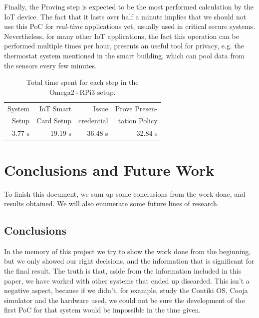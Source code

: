 \documentclass[journal]{IEEEtran}
\begin{document}
Finally, the Proving step is expected to be the most performed calculation by the IoT device. The fact that it lasts over half a minute implies that we should not use this PoC for \textit{real-time} applications yet, usually used in critical secure systems. Nevertheless, for many other IoT applications, the fact this operation can be performed multiple times per hour, presents an useful tool for privacy, e.g. the thermostat system mentioned in the smart building, which can pool data from the sensors every few minutes.


\begin{table}[!ht]
	\begin{center}
		\begin{tabular}{|r|r|r|r|}
			\hline
			System & IoT Smart  & Issue  & Prove Presen-\\
			Setup & Card Setup & credential & tation Policy\\ \hline
			3.77 s & 19.19 s & 36.48 s & 32.84 s \\ \hline
		\end{tabular}
	\end{center}
	\caption{Total time spent for each step in the Omega2+RPi3 setup.}
	\label{totaltime}
\end{table}











\section{Conclusions and Future Work}\label{ch:conclusions}

To finish this document, we sum up some conclusions from the work done, and results 
obtained. We will also enumerate some future lines of research.

\subsection{Conclusions}


In the memory of this project we try to show the work done from the beginning, but we only showed our right decisions, and the information that is significant for the final result. The truth is that, aside from the information included in this paper, we have worked with other systems that ended up discarded. This isn't a negative aspect, because if we didn't, for example, study the Contiki OS, Cooja simulator and the hardware used, we could not be sure the development of the first PoC for that system would be impossible in the time given.
\end{document}
